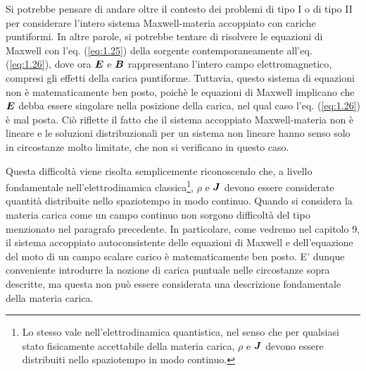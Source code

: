 Si potrebbe pensare di andare oltre il contesto dei problemi di tipo I o di tipo II per considerare l'intero sistema Maxwell-materia accoppiato con cariche puntiformi. In altre parole, si potrebbe tentare di risolvere le equazioni di Maxwell con l'eq. (\ref{eq:1.25}) della sorgente contemporaneamente all'eq. (\ref{eq:1.26}), 
dove ora $\vb*{E}$ e $\vb*{B}$ rappresentano l'intero campo elettromagnetico, compresi gli effetti della carica puntiforme. Tuttavia, questo sistema di equazioni non è matematicamente ben posto, poichè le equazioni di Maxwell implicano che  $\vb*{E}$ debba essere singolare nella posizione della carica, nel qual caso l'eq. (\ref{eq:1.26}) è mal posta. Ciò riflette il fatto che il sistema accoppiato Maxwell-materia non è lineare e le soluzioni distribuzionali per un sistema non lineare hanno senso solo in circostanze molto limitate, che non si verificano in questo caso.

Questa difficoltà viene risolta semplicemente riconoscendo che, a livello fondamentale nell'elettrodinamica classica\footnote{Lo stesso vale nell'elettrodinamica quantistica, nel senso che per qualsiasi stato fisicamente accettabile della materia carica, $\rho$ e  $\vb*{J}$ devono essere distribuiti nello spaziotempo in modo continuo.}, $\rho$ e  $\vb*{J}$ devono essere considerate quantità distribuite nello spaziotempo in modo continuo. Quando si considera la materia carica come un campo continuo non sorgono difficoltà del tipo menzionato nel paragrafo precedente. In particolare, come vedremo nel capitolo 9, il sistema accoppiato autoconsistente delle equazioni di Maxwell e dell'equazione del moto di un campo scalare carico è matematicamente ben posto. E' dunque conveniente introdurre la nozione di carica puntuale nelle circostanze sopra descritte, ma questa non può essere considerata una descrizione fondamentale della materia carica.


  
    